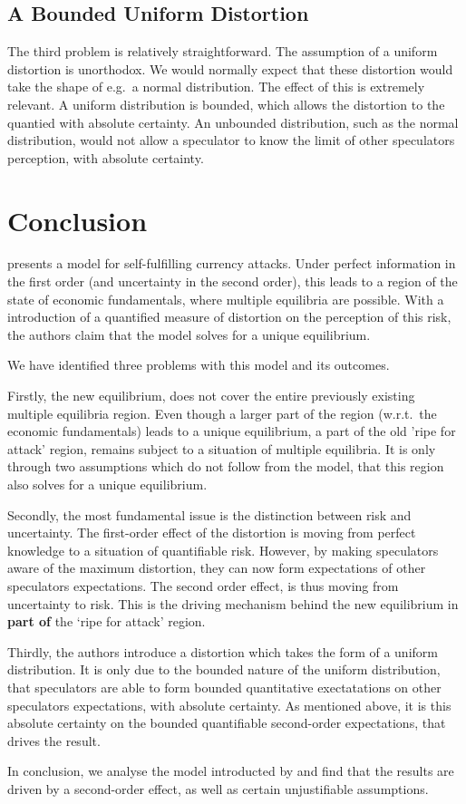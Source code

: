 \begin{refsection}
\subsection{A Bounded Uniform Distortion}
The third problem is relatively straightforward.
The assumption of a uniform distortion is unorthodox.
We would normally expect that these distortion would take the shape of e.g.~a normal distribution.
The effect of this is extremely relevant.
A uniform distribution is bounded,
which allows the distortion to the quantied with absolute certainty.
An unbounded distribution, such as the normal distribution,
would not allow a speculator to know the limit of other speculators perception,
with absolute certainty.

\section{Conclusion}
\textcite{morris1998unique} presents a model for self-fulfilling currency attacks.
Under perfect information in the first order (and uncertainty in the second order),
this leads to a region of the state of economic fundamentals, where multiple equilibria are possible.
With a introduction of a quantified measure of distortion on the perception of this risk,
the authors claim that the model solves for a unique equilibrium.

We have identified three problems with this model and its outcomes.

Firstly, the new equilibrium, does not cover the entire previously existing multiple equilibria region.
Even though a larger part of the region (w.r.t.~the economic fundamentals) leads to a unique equilibrium,
a part of the old 'ripe for attack' region, remains subject to a situation of multiple equilibria.
It is only through two assumptions which do not follow from the model,
that this region also solves for a unique equilibrium.

Secondly, the most fundamental issue is the distinction between risk and uncertainty.
The first-order effect of the distortion is moving from perfect knowledge to a situation of quantifiable risk.
However, by making speculators aware of the maximum distortion,
they can now form expectations of other speculators expectations.
The second order effect, is thus moving from uncertainty to risk.
This is the driving mechanism behind the new equilibrium in \textbf{part of} the `ripe for attack' region.

Thirdly, the authors introduce a distortion which takes the form of a uniform distribution.
It is only due to the bounded nature of the uniform distribution,
that speculators are able to form bounded quantitative exectatations on other speculators expectations, with absolute certainty.
As mentioned above, it is this absolute certainty on the bounded quantifiable second-order expectations,
that drives the result.

In conclusion, we analyse the model introducted by \textcite{morris1998unique} and find that the results are driven by a second-order effect, as well as certain unjustifiable assumptions.


\nocite{taleb2010black}
\printbibliography

\end{refsection}